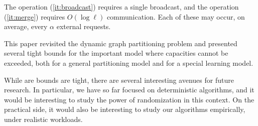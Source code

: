 \documentclass[a4paper,anonymous,USenglish]{lipics-v2019}
\begin{document}
The operation (\ref{it:broadcast}) requires a single broadcast, and the operation (\ref{it:merge}) requires $O(\log \ell)$ communication.
Each of these may occur, on average, every $\alpha$ external requests.

\medskip

This paper revisited the dynamic graph partitioning problem and presented several tight bounds for the important model where capacities cannot be exceeded, both for a general partitioning model and for a special learning model. 

While are bounds are tight, there are several interesting avenues for future research.
In particular, we have so far focused on deterministic algorithms, and it would be interesting to study the power of randomization in this context.
On the practical side, it would also be interesting to study our algorithms empirically, under realistic workloads.



\appendix
\end{document}
